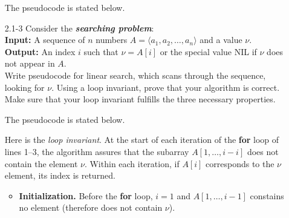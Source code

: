 \begin{enumerate}
\begin{framed}
The pseudocode is stated below.\\
\begin{algorithm}[H]
\SetAlgoNoEnd\DontPrintSemicolon
\BlankLine
{}
\end{algorithm}
\end{framed}

\item[2.1{-}3]{Consider the \textbf{\emph{searching problem}}:\vspace{1mm}\\
\textbf{Input:} A sequence of $n$ numbers $A = \langle a_1, a_2, \dots, a_n \rangle$ and a value $\nu$.\\
\textbf{Output:} An index $i$ such that $\nu = A[i]$ or the special value NIL if $\nu$ does not appear in $A$.\vspace{1mm}\\
Write pseudocode for linear search, which scans through the sequence, looking
for $\nu$. Using a loop invariant, prove that your algorithm is correct. Make
sure that your loop invariant fulfills the three necessary properties.}

\begin{framed}
The pseudocode is stated below.\\
\begin{algorithm}[H]
\SetAlgoNoEnd\DontPrintSemicolon
\BlankLine
{}
\end{algorithm}

Here is the \emph{loop invariant}. At the start of each iteration of the
\textbf{for} loop of lines 1{--}3, the algorithm assures that the subarray $A[1,
\dots, i - i]$ does not contain the element $\nu$. Within each iteration, if
$A[i]$ corresponds to the $\nu$ element, its index is returned.

\begin{itemize}
  \item \textbf{Initialization.} Before the \textbf{for} loop, $i = 1$ and $A[1,
    \dots, i - 1]$ constains no element (therefore does not contain $\nu$).


\end{itemize}
\end{framed}
\end{enumerate}
